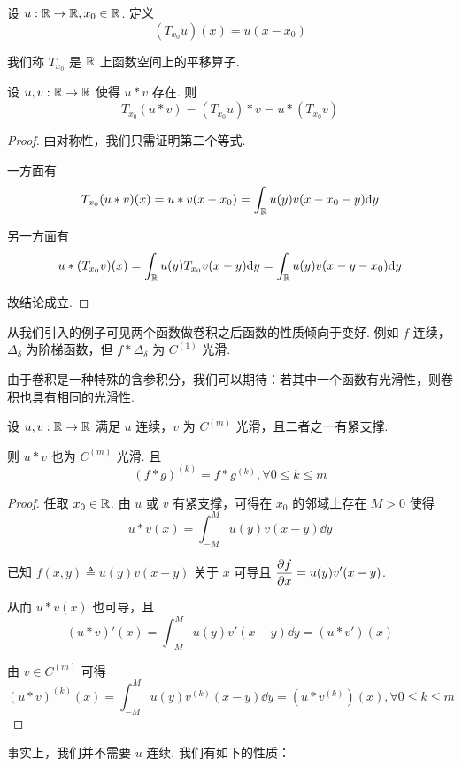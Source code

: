 
设 $u:\mathbb{R}\to\mathbb{R},x_0\in\mathbb{R}$. 定义
$$
(T_{x_0}u)(x)=u(x-x_0)
$$

我们称 $T_{x_0}$ 是 $\mathbb{R}$ 上函数空间上的平移算子.

\begin{property}
    设 $u,v:\mathbb{R}\to\mathbb{R}$ 使得 $u*v$ 存在. 则
$$
T_{x_0}(u*v)=(T_{x_0}u)*v=u*(T_{x_0}v)
$$
\end{property}
\begin{proof}
    由对称性，我们只需证明第二个等式.

    一方面有
$$
T_{x_0}(u*v)(x)=u*v(x-x_0)=\int_{\mathbb{R}} u(y)v(x-x_0-y)\mathrm{d} y
$$

    另一方面有
$$
u*(T_{x_0}v)(x)=\int_{\mathbb{R}} u(y)T_{x_0}v(x-y)\mathrm{d} y=\int_{\mathbb{R}} u(y)v(x-y-x_0)\mathrm{d} y
$$

    故结论成立.
\end{proof}


从我们引入的例子可见两个函数做卷积之后函数的性质倾向于变好. 例如 $f$ 连续，$\Delta_\delta$ 为阶梯函数，但 $f*\Delta_\delta$ 为 $C^{(1)}$ 光滑.

由于卷积是一种特殊的含参积分，我们可以期待：若其中一个函数有光滑性，则卷积也具有相同的光滑性.

\begin{property}
    设 $u,v:\mathbb{R}\to\mathbb{R}$ 满足 $u$ 连续，$v$ 为 $C^{(m)}$ 光滑，且二者之一有紧支撑.

    则 $u*v$ 也为 $C^{(m)}$ 光滑. 且
$$
(f*g)^{(k)}=f*g^{(k)},\forall 0\le k\le m
$$
\end{property}
\begin{proof}
    任取 $x_0\in\mathbb{R}$. 由 $u$ 或 $v$ 有紧支撑，可得在 $x_0$ 的邻域上存在 $M>0$ 使得
$$
u*v(x)=\int_{-M}^Mu(y)v(x-y)\dd y
$$

    已知 $f(x,y)\triangleq u(y)v(x-y)$ 关于 $x$ 可导且 $\displaystyle\frac{\partial{f}}{\partial{x}}=u(y)v'(x-y)$.

    从而 $u*v(x)$ 也可导，且
$$
(u*v)'(x)=\int_{-M}^Mu(y)v'(x-y)\dd y=(u*v')(x)
$$

    由 $v\in C^{(m)}$ 可得
$$
(u*v)^{(k)}(x)=\int_{-M}^M u(y)v^{(k)}(x-y)\dd y=(u*v^{(k)})(x),\forall 0\le k\le m
$$
\end{proof}

事实上，我们并不需要 $u$ 连续. 我们有如下的性质：

